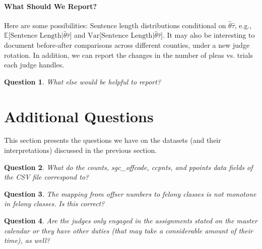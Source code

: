 \documentclass[11pt, oneside]{article}   	%
\theoremstyle{ModifiedStyle}
\newtheorem{question}{Question}
\begin{document}
\paragraph{What Should We Report?} Here are some possibilities: Sentence length distributions conditional
on $\hat{\theta}\hat{\tau}$, e.g., $\mathbb{E}\big[ \text{Sentence Length}\big| \hat{\theta}\hat{\tau} \big]$ and $\text{Var}\big[ \text{Sentence Length}\big| \hat{\theta}\hat{\tau} \big]$. It may also be interesting to document before-after comparisons across different counties, under a new judge rotation. In addition, we can report the changes in the number of pleas vs. trials each judge handles.
%
\begin{question}
	What else would be helpful to report?
\end{question}


\section{Additional Questions}
\label{Sec:Questions}

This section presents the questions we have on the datasets (and their interpretations) discussed in the previous section.

\begin{question}
	What do the counts, sgc\_offcode, ccpnts, and ppoints data fields of the CSV file correspond to?
\end{question}

\begin{question}
	The mapping from offser numbers to felony classes is not monotone in felony classes. Is this correct?
\end{question}

\begin{question}
	Are the judges only engaged in the assignments stated on the master calendar or they have other duties (that may take a considerable amount of their time), as well?
\end{question}




\clearpage
\appendix
\end{document}
